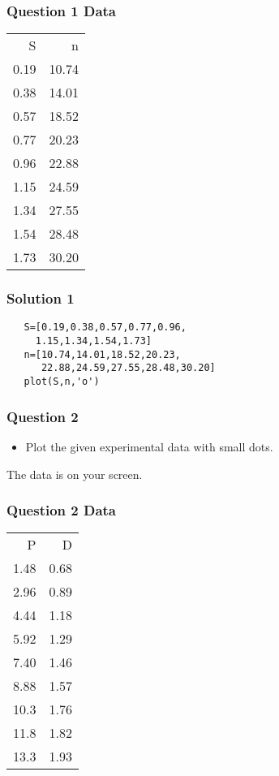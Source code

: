 \documentclass[presentation]{beamer}
\begin{document}
\begin{frame}
\frametitle{Question 1 Data}
\label{sec-5}


    
  

\begin{center}
\begin{tabular}{rr}
    S  &      n  \\
 0.19  &  10.74  \\
 0.38  &  14.01  \\
 0.57  &  18.52  \\
 0.77  &  20.23  \\
 0.96  &  22.88  \\
 1.15  &  24.59  \\
 1.34  &  27.55  \\
 1.54  &  28.48  \\
 1.73  &  30.20  \\
\end{tabular}
\end{center}


    
\end{frame}
\begin{frame}[fragile]
\frametitle{Solution 1}
\label{sec-6}


\begin{verbatim}
   S=[0.19,0.38,0.57,0.77,0.96,
     1.15,1.34,1.54,1.73]
   n=[10.74,14.01,18.52,20.23,
      22.88,24.59,27.55,28.48,30.20]
   plot(S,n,'o')
\end{verbatim}
\end{frame}
\begin{frame}
\frametitle{Question 2}
\label{sec-7}

\begin{itemize}
\item Plot the given experimental data with small dots.
\end{itemize}

  The data is on your screen.     
\end{frame}
\begin{frame}
\frametitle{Question 2 Data}
\label{sec-8}




\begin{center}
\begin{tabular}{rr}
    P  &     D  \\
 1.48  &  0.68  \\
 2.96  &  0.89  \\
 4.44  &  1.18  \\
 5.92  &  1.29  \\
 7.40  &  1.46  \\
 8.88  &  1.57  \\
 10.3  &  1.76  \\
 11.8  &  1.82  \\
 13.3  &  1.93  \\
\end{tabular}
\end{center}


  
\end{frame}
\end{document}
